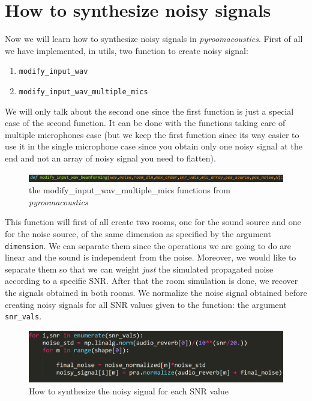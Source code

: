 \documentclass[11pt,a4paper,titlepage]{report}
\providecommand{\tightlist}{%
	\setlength{\itemsep}{0pt}\setlength{\parskip}{0pt}}
\begin{document}
\section{How to synthesize noisy signals}
\label{sec:synth}
\hspace*{0.6cm}
Now we will learn how to synthesize noisy signals in \textit{pyroomacoustics}. First of all we have implemented, in utils, two function to create noisy signal:
\begin{enumerate}
	\tightlist
	\item \texttt{modify\_input\_wav}
	\item \texttt{modify\_input\_wav\_multiple\_mics}
\end{enumerate}
We will only talk about the second one since the first function is just a special case of the second function. It can be done with the functions taking care of multiple microphones case (but we keep the first function since its way easier to use it in the single microphone case since you obtain only one noisy signal at the end and not an array of noisy signal you need to flatten).
\begin{figure}[h!]
	\centering
	\includegraphics[width=1.0\linewidth]{Rapport9}
	\caption{the modify\_input\_wav\_multiple\_mics functions from \textit{pyroomacoustics}}
	\label{fig:rapport9}
\end{figure}
This function will first of all create two rooms, one for the sound source and one for the noise source, of the same dimension as specified by the argument \texttt{dimension}. We can separate them since the operations we are going to do are linear and the sound is independent from the noise. Moreover, we would like to separate them so that we can weight \emph{just} the simulated propagated noise according to a specific SNR. After that the room simulation is done, we recover the signals obtained in both rooms. We normalize the noise signal obtained before creating noisy signals for all SNR values given to the function: the argument \texttt{snr\_vals}.
\begin{figure}[h!]
	\centering
	\includegraphics[width=0.7\linewidth]{Rapport10}
	\caption{How to synthesize the noisy signal for each SNR value}
	\label{fig:rapport10}
\end{figure}\\
\end{document}
